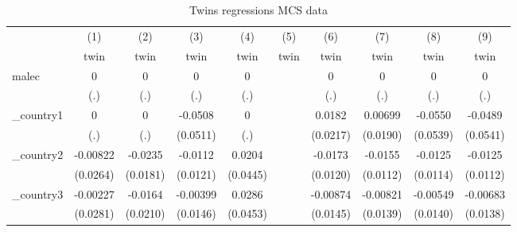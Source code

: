 \begin{table}[htbp]\centering
\def\sym#1{\ifmmode^{#1}\else\(^{#1}\)\fi}
\caption{Twins regressions MCS data}
\begin{tabular}{l*{9}{c}}
\hline\hline
            &\multicolumn{1}{c}{(1)}&\multicolumn{1}{c}{(2)}&\multicolumn{1}{c}{(3)}&\multicolumn{1}{c}{(4)}&\multicolumn{1}{c}{(5)}&\multicolumn{1}{c}{(6)}&\multicolumn{1}{c}{(7)}&\multicolumn{1}{c}{(8)}&\multicolumn{1}{c}{(9)}\\
            &\multicolumn{1}{c}{twin}&\multicolumn{1}{c}{twin}&\multicolumn{1}{c}{twin}&\multicolumn{1}{c}{twin}&\multicolumn{1}{c}{twin}&\multicolumn{1}{c}{twin}&\multicolumn{1}{c}{twin}&\multicolumn{1}{c}{twin}&\multicolumn{1}{c}{twin}\\
\hline
malec       &           0         &           0         &           0         &           0         &                     &           0         &           0         &           0         &           0         \\
            &         (.)         &         (.)         &         (.)         &         (.)         &                     &         (.)         &         (.)         &         (.)         &         (.)         \\
[1em]
\_country1   &           0         &           0         &     -0.0508         &           0         &                     &      0.0182         &     0.00699         &     -0.0550         &     -0.0489         \\
            &         (.)         &         (.)         &    (0.0511)         &         (.)         &                     &    (0.0217)         &    (0.0190)         &    (0.0539)         &    (0.0541)         \\
[1em]
\_country2   &    -0.00822         &     -0.0235         &     -0.0112         &      0.0204         &                     &     -0.0173         &     -0.0155         &     -0.0125         &     -0.0125         \\
            &    (0.0264)         &    (0.0181)         &    (0.0121)         &    (0.0445)         &                     &    (0.0120)         &    (0.0112)         &    (0.0114)         &    (0.0112)         \\
[1em]
\_country3   &    -0.00227         &     -0.0164         &    -0.00399         &      0.0286         &                     &    -0.00874         &    -0.00821         &    -0.00549         &    -0.00683         \\
            &    (0.0281)         &    (0.0210)         &    (0.0146)         &    (0.0453)         &                     &    (0.0145)         &    (0.0139)         &    (0.0140)         &    (0.0138)         \\

\end{tabular}
\end{table}
